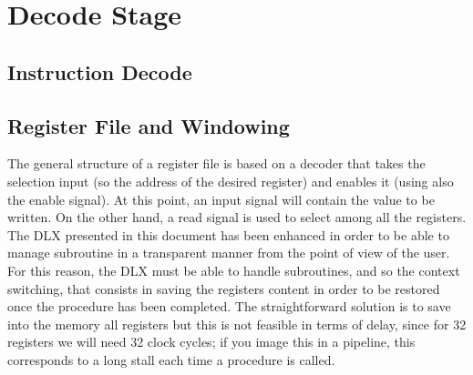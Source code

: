 \chapter{Decode Stage}

\section{Instruction Decode}
\section{Register File and Windowing}
The general structure of a register file is based on a decoder that takes the selection input (so the address of the desired register) and enables it (using also the enable signal). At this point, an input signal will contain the value to be written. On the other hand, a read signal is used to select among all the registers.\newline\newline
The DLX presented in this document has been enhanced in order to be able to manage subroutine in a transparent manner from the point of view of the user. For this reason, the DLX must be able to handle subroutines, and so the context switching, that consists in saving the
registers content in order to be restored once the procedure has been completed. The straightforward solution is to save into the memory all registers but this is not feasible in terms of delay, since for 32 registers we will need 32 clock cycles; if you image this in a pipeline, this corresponds to a long stall each time a procedure is called.

